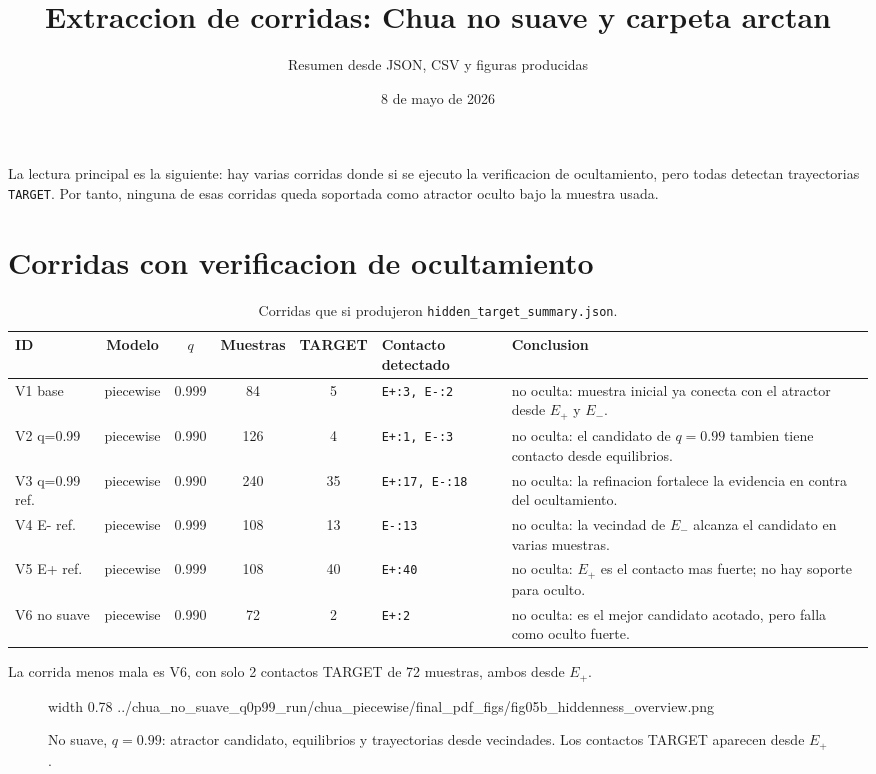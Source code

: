\documentclass[11pt]{article}
\title{Extraccion de corridas: Chua no suave y carpeta arctan}
\author{Resumen desde JSON, CSV y figuras producidas}
\date{8 de mayo de 2026}
\newcommand{\img}[2]{%
  \begingroup
  \pdfximage width #1 {#2}%
  \pdfrefximage\pdflastximage
  \endgroup
}
\newcommand{\pathcell}[1]{\texttt{\footnotesize #1}}
\newcommand{\bad}{\textcolor{red!65!black}{no oculta}}
\begin{document}
\maketitle


La lectura principal es la siguiente: hay varias corridas donde si se ejecuto
la verificacion de ocultamiento, pero todas detectan trayectorias
\pathcell{TARGET}. Por tanto, ninguna de esas corridas queda soportada como
atractor oculto bajo la muestra usada. 

\section*{Corridas con verificacion de ocultamiento}

\begin{table}[H]
\centering
\caption{Corridas que si produjeron \pathcell{hidden\_target\_summary.json}.}
\scriptsize
\begin{tabularx}{\textwidth}{>{\raggedright\arraybackslash}p{2.1cm}cccclX}
\toprule
ID & Modelo & \(q\) & Muestras & TARGET & Contacto detectado & Conclusion \\
\midrule
V1 base &
piecewise & 0.999 & 84 & 5 &
\pathcell{E+:3, E-:2} &
\bad: muestra inicial ya conecta con el atractor desde \(E_+\) y \(E_-\). \\
V2 q=0.99 &
piecewise & 0.990 & 126 & 4 &
\pathcell{E+:1, E-:3} &
\bad: el candidato de \(q=0.99\) tambien tiene contacto desde equilibrios. \\
V3 q=0.99 ref. &
piecewise & 0.990 & 240 & 35 &
\pathcell{E+:17, E-:18} &
\bad: la refinacion fortalece la evidencia en contra del ocultamiento. \\
V4 E- ref. &
piecewise & 0.999 & 108 & 13 &
\pathcell{E-:13} &
\bad: la vecindad de \(E_-\) alcanza el candidato en varias muestras. \\
V5 E+ ref. &
piecewise & 0.999 & 108 & 40 &
\pathcell{E+:40} &
\bad: \(E_+\) es el contacto mas fuerte; no hay soporte para oculto. \\
V6 no suave &
piecewise & 0.990 & 72 & 2 &
\pathcell{E+:2} &
\bad: es el mejor candidato acotado, pero falla como oculto fuerte. \\
\bottomrule
\end{tabularx}
\end{table}

\noindent
 La corrida menos mala es
V6, con solo 2 contactos TARGET de 72 muestras, ambos desde \(E_+\).

\begin{figure}[H]
\centering
\img{0.78\textwidth}{../chua_no_suave_q0p99_run/chua_piecewise/final_pdf_figs/fig05b_hiddenness_overview.png}
\caption{No suave, \(q=0.99\): atractor candidato, equilibrios y trayectorias desde vecindades. Los contactos TARGET aparecen desde \(E_+\).}
\end{figure}
\end{document}
